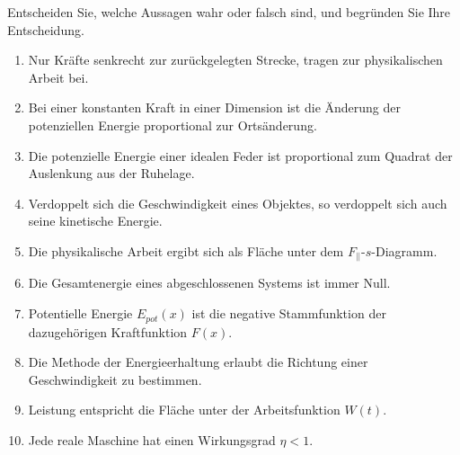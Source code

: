 \begin{ExerciseBlock}
Entscheiden Sie, welche Aussagen wahr oder falsch sind, und begründen Sie Ihre Entscheidung.
\begin{enumerate}
\item Nur Kräfte senkrecht zur zurückgelegten Strecke, tragen zur physikalischen Arbeit bei.
\item Bei einer konstanten Kraft in einer Dimension ist die Änderung der potenziellen Energie proportional zur Ortsänderung.
\item Die potenzielle Energie einer idealen Feder ist proportional zum Quadrat der Auslenkung aus der Ruhelage.
\item Verdoppelt sich die Geschwindigkeit eines Objektes, so verdoppelt sich auch seine kinetische Energie.
\item Die physikalische Arbeit ergibt sich als Fläche unter dem $F_{||}$-$s$-Diagramm.
\item Die Gesamtenergie eines abgeschlossenen Systems ist immer Null.
\item Potentielle Energie $E_{pot}(x)$ ist die negative Stammfunktion der dazugehörigen Kraftfunktion $F(x)$.
\item Die Methode der Energieerhaltung erlaubt die Richtung einer Geschwindigkeit zu bestimmen.
\item Leistung entspricht die Fläche unter der Arbeitsfunktion $W(t)$.
\item Jede reale Maschine hat einen Wirkungsgrad $\eta < 1$.
\end{enumerate}
\end{ExerciseBlock}
